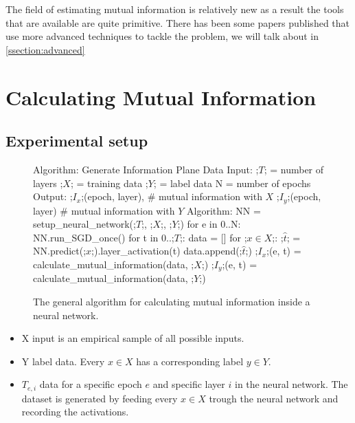 The field of estimating mutual information is relatively new as a result the
tools that are available are quite primitive. There has been some papers
published that use more advanced techniques to tackle the problem, we will talk
about in \autoref{ssection:advanced}

\section{Calculating Mutual Information}

\subsection{Experimental setup}

\begin{figure}[H]
    \begin{pythonfigure}
      Algorithm: Generate Information Plane Data
      Input:
      ;$T$; = number of layers
      ;$X$; = training data
      ;$Y$; = label data
      N = number of epochs
      Output: 
      ;$I_x$;(epoch, layer), # mutual information with $X$ 
      ;$I_y$;(epoch, layer)  # mutual information with $Y$ 
      Algorithm:
      NN = setup_neural_network(;$T$;, ;$X$;, ;$Y$;)
      for e in 0..N:
        NN.run_SGD_once()
        for t in 0..;$T$;:
          data = []
          for ;$x \in X$;:
            ;$\hat{t}$; = NN.predict(;$x$;).layer_activation(t)
            data.append(;$\hat{t}$;)
          ;$I_x$;(e, t) = calculate_mutual_information(data, ;$X$;)
          ;$I_y$;(e, t) = calculate_mutual_information(data, ;$Y$;)
    \end{pythonfigure}
    \caption{The general algorithm for calculating mutual information inside a
    neural network.}
    \label{fig:general}
\end{figure}

\begin{itemize}
  \item{
      X input is an empirical sample of all possible inputs.
    }
  \item{
      Y label data. Every $x \in X$ has a corresponding label $y \in Y$. 
    }
  \item{
      $T_{e,i}$ data for a specific epoch $e$ and specific layer $i$ in the
      neural network. The dataset is  generated by feeding every $x \in X$
      trough the neural network and recording the activations.
    }
\end{itemize}

\newpage

